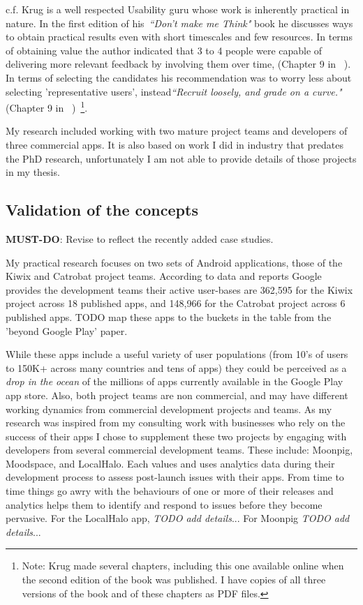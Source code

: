 c.f. Krug is a well respected Usability guru whose work is inherently practical in nature. In the first edition of his~\emph{``Don't make me Think"} book he discusses ways to obtain practical results even with short timescales and few resources. In terms of obtaining value the author indicated that 3 to 4 people were capable of delivering more relevant feedback by involving them over time, (Chapter 9 in ~\cite{krug2000dont_make_me_think}). In terms of selecting the candidates his recommendation was to worry less about selecting 'representative users', instead\emph{``Recruit loosely, and grade on a curve."} (Chapter 9 in ~\cite{krug2000dont_make_me_think})~\footnote{Note: Krug made several chapters, including this one available online when the second edition of the book was published. I have copies of all three versions of the book and of these chapters as PDF files.}.


My research included working with two mature project teams and developers of three commercial apps. It is also based on work I did in industry that predates the PhD research, unfortunately I am not able to provide details of those projects in my thesis. 


\subsection{Validation of the concepts}
\textbf{MUST-DO}: Revise to reflect the recently added case studies. 

My practical research focuses on two sets of Android applications, those of the Kiwix and Catrobat project teams. According to data and reports Google provides the development teams their active user-bases are 362,595 for the Kiwix project across 18 published apps, and 148,966 for the Catrobat project across 6 published apps. %
TODO map these apps to the buckets in the table from the 'beyond Google Play' paper.

While these apps include a useful variety of user populations (from 10's of users to 150K+ across many countries and tens of apps) they could be perceived as a \emph{drop in the ocean} of the millions of apps currently available in the Google Play app store. Also, both project teams are non commercial, and may have different working dynamics from commercial development projects and teams. As my research was inspired from my consulting work with businesses who rely on the success of their apps I chose to supplement these two projects by engaging with developers from several commercial development teams. These include: Moonpig, Moodspace, and LocalHalo. Each values and uses analytics data during their development process to assess post-launch issues with their apps. From time to time things go awry with the behaviours of one or more of their releases and analytics helps them to identify and respond to issues before they become pervasive. For the LocalHalo app, \emph{TODO add details}... For Moonpig \emph{TODO add details}...

